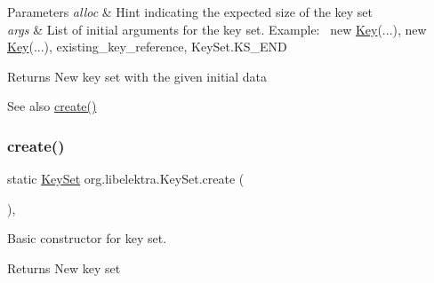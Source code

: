 \begin{DoxyParams}{Parameters}
{\em alloc} & Hint indicating the expected size of the key set \\
\hline
{\em args} & List of initial arguments for the key set. Example\+:~\newline
 new \hyperlink{classorg_1_1libelektra_1_1Key}{Key}(...), new \hyperlink{classorg_1_1libelektra_1_1Key}{Key}(...), existing\+\_\+key\+\_\+reference, Key\+Set.\+K\+S\+\_\+\+E\+ND \\
\hline
\end{DoxyParams}
\begin{DoxyReturn}{Returns}
New key set with the given initial data 
\end{DoxyReturn}
\begin{DoxySeeAlso}{See also}
\hyperlink{classorg_1_1libelektra_1_1KeySet_ac0ba4b88bef5e731b586f4ca63b9ab7f}{create()} 
\end{DoxySeeAlso}
\mbox{\label{classorg_1_1libelektra_1_1KeySet_ac0ba4b88bef5e731b586f4ca63b9ab7f}} 
\subsubsection{\texorpdfstring{create()}{create()}\hspace{0.1cm}{\footnotesize\ttfamily [2/3]}}
{\footnotesize\ttfamily static \hyperlink{classorg_1_1libelektra_1_1KeySet}{Key\+Set} org.\+libelektra.\+Key\+Set.\+create (\begin{DoxyParamCaption}{ }\end{DoxyParamCaption})\hspace{0.3cm}{\ttfamily [inline]}, {\ttfamily [static]}}



Basic constructor for key set. 

\begin{DoxyReturn}{Returns}
New key set 
\end{DoxyReturn}
\mbox{\label{classorg_1_1libelektra_1_1KeySet_a441d0e45a150a6fd5f75be00ec42338d}} 
